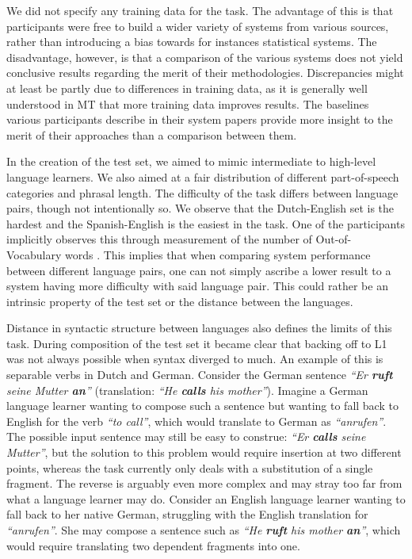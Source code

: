 We did not specify any training data for the task. The advantage of this is
that participants were free to build a wider variety of systems from various
sources, rather than introducing a bias towards for instances statistical
systems. The disadvantage, however, is that a comparison of the various systems
does not yield conclusive results regarding the merit of their methodologies.
Discrepancies might at least be partly due to differences in training data, as
it is generally well understood in MT that more training data improves results.
The baselines various participants describe in their system papers provide more
insight to the merit of their approaches than a comparison between them.

In the creation of the test set, we aimed to mimic intermediate to high-level
language learners. We also aimed at a fair distribution of different
part-of-speech categories and phrasal length. The difficulty of the task
differs between language pairs, though not intentionally so. We observe that
the Dutch-English set is the hardest and the Spanish-English is the easiest in
the task. One of the participants implicitly observes this through measurement
of the number of Out-of-Vocabulary words \citep{CNRC}. This implies that when
comparing system performance between different language pairs, one can not
simply ascribe a lower result to a system having more difficulty with said
language pair. This could rather be an intrinsic property of the test set or
the distance between the languages.

Distance in syntactic structure between languages also defines the limits of
this task. During composition of the test set it became clear that backing off
to L1 was not always possible when syntax diverged to much. An example of this
is separable verbs in Dutch and German. Consider the German sentence \emph{``Er
\textbf{ruft} seine Mutter \textbf{an}''} (translation: \emph{``He
\textbf{calls} his mother''}). Imagine a German language learner wanting to
compose such a sentence but wanting to fall back to English for the verb
\emph{``to call''}, which would translate to German as \emph{``anrufen''}. The
possible input sentence may still be easy to construe: \emph{``Er
\textbf{calls} seine Mutter''}, but the solution to this problem would require
insertion at two different points, whereas the task currently only deals with a
substitution of a single fragment. The reverse is arguably even more complex
and may stray too far from what a language learner may do. Consider an English
language learner wanting to fall back to her native German, struggling with the
English translation for \emph{``anrufen''}. She may compose a sentence such as
\emph{``He \textbf{ruft} his mother \textbf{an}''}, which would require
translating two dependent fragments into one.

